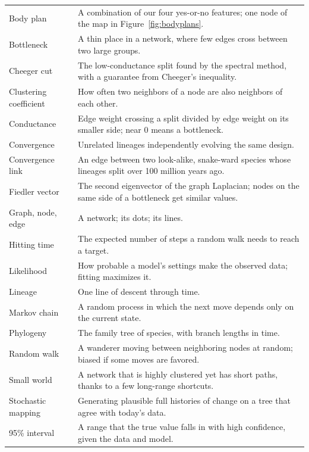 \documentclass[11pt]{article}
\begin{document}
\small
\begin{tabularx}{\textwidth}{@{}lX@{}}
\toprule
Body plan & A combination of our four yes-or-no features; one node of the map in Figure~\ref{fig:bodyplans}. \\
Bottleneck & A thin place in a network, where few edges cross between two large groups. \\
Cheeger cut & The low-conductance split found by the spectral method, with a guarantee from Cheeger's inequality. \\
Clustering coefficient & How often two neighbors of a node are also neighbors of each other. \\
Conductance & Edge weight crossing a split divided by edge weight on its smaller side; near 0 means a bottleneck. \\
Convergence & Unrelated lineages independently evolving the same design. \\
Convergence link & An edge between two look-alike, snake-ward species whose lineages split over 100 million years ago. \\
Fiedler vector & The second eigenvector of the graph Laplacian; nodes on the same side of a bottleneck get similar values. \\
Graph, node, edge & A network; its dots; its lines. \\
Hitting time & The expected number of steps a random walk needs to reach a target. \\
Likelihood & How probable a model's settings make the observed data; fitting maximizes it. \\
Lineage & One line of descent through time. \\
Markov chain & A random process in which the next move depends only on the current state. \\
Phylogeny & The family tree of species, with branch lengths in time. \\
Random walk & A wanderer moving between neighboring nodes at random; biased if some moves are favored. \\
Small world & A network that is highly clustered yet has short paths, thanks to a few long-range shortcuts. \\
Stochastic mapping & Generating plausible full histories of change on a tree that agree with today's data. \\
95\% interval & A range that the true value falls in with high confidence, given the data and model. \\
\bottomrule
\end{tabularx}
\end{document}
